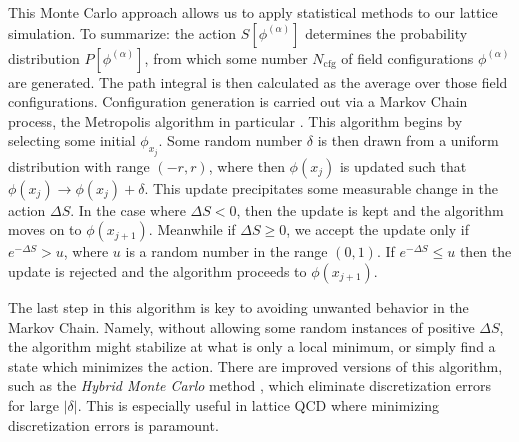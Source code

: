 This Monte Carlo approach allows us to apply statistical methods to our lattice simulation.  To summarize: the action $S[\phi^{(\alpha)}]$ determines the probability distribution $P[\phi^{(\alpha)}]$, from which some number $N_\mathrm{cfg}$ of field configurations $\phi^{(\alpha)}$ are generated.  The path integral is then calculated as the average over those field configurations. Configuration generation is carried out via a Markov Chain process, the Metropolis algorithm in particular \cite{Metropolis:1953am}.  This algorithm begins by selecting some initial $\phi_{x_j}$.  Some random number $\delta$ is then drawn from a uniform distribution with range $(-r,r)$, where then $\phi({x_j})$ is updated such that $\phi({x_j})\rightarrow \phi({x_j})+\delta$.  This update precipitates some measurable change in the action $\Delta S$.  In the case where $\Delta S < 0$, then the update is kept and the algorithm moves on to $\phi(x_{j+1})$.  Meanwhile if $\Delta S \geq 0$, we accept the update only if $e^{-\Delta S}> u$, where $u$ is a random number in the range $(0,1)$.  If $e^{-\Delta S} \leq u$ then the update is rejected and the algorithm proceeds to $\phi(x_{j+1})$.

The last step in this algorithm is key to avoiding unwanted behavior in the Markov Chain.  Namely, without allowing some random instances of positive $\Delta S$, the algorithm might stabilize at what is only a local minimum, or simply find a state which minimizes the action.  There are improved versions of this algorithm, such as the \textit{Hybrid Monte Carlo} method \cite{Duane:1987de}, which eliminate discretization errors for large $|\delta|$.  This is especially useful in lattice QCD where minimizing discretization errors is paramount.



